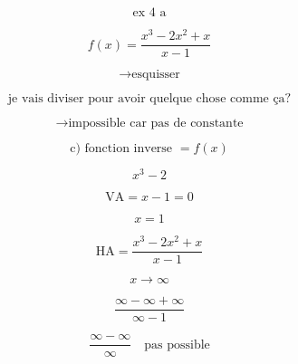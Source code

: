 \documentclass{article}
\begin{document}
\[ \text{ex 4 a} \]

\[ f(x) = \frac{x^3 - 2x^2 + x}{x-1} \]

\[ \rightarrow \text{esquisser} \]

\[ \text{je vais diviser pour avoir quelque chose comme ça?} \]

\[ \rightarrow \text{impossible car pas de constante} \]

\[ \text{c) fonction inverse } = f(x) \]

\[ x^3 - 2 \]

\[ \text{VA} = x - 1 = 0 \]

\[ x = 1 \]

\[ \text{HA} = \frac{x^3 - 2x^2 + x}{x-1} \]

\[ x \rightarrow \infty \]

\[ \frac{\infty - \infty + \infty}{\infty - 1} \]

\[ \frac{\infty - \infty}{\infty} \quad \text{pas possible} \]
\end{document}
